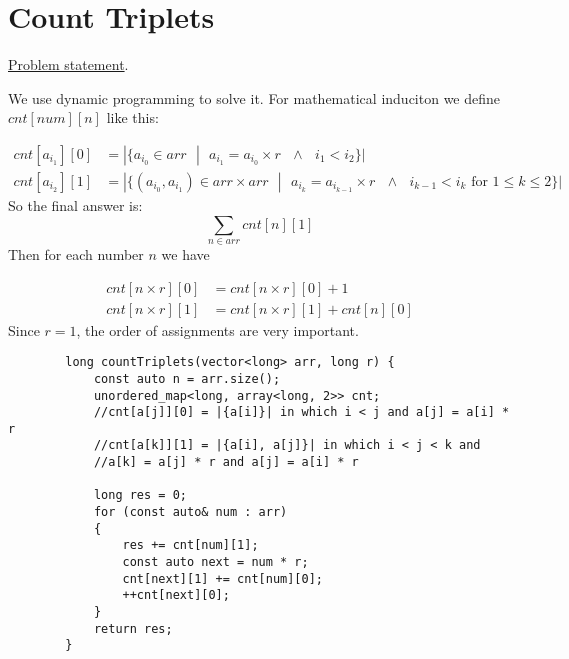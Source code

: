 \documentclass{book}
\begin{document}
 	\section{Count Triplets}
 	\href{https://www.hackerrank.com/challenges/count-triplets-1/problem?h_l=interview&playlist_slugs%5B%5D=interview-preparation-kit&playlist_slugs%5B%5D=dictionaries-hashmaps}{Problem statement}.
 		
 	\par We use dynamic programming to solve it. For mathematical induciton we define $cnt[num][n]$ like this:
 	
 	\begin{equation*}
 		\begin{split}
 		cnt[a_{i_1}][0] &= |\{a_{i_0} \in arr \text{ }| \text{ } a_{i_1} = a_{i_0} \times r \text{ }\land \text{ } i_1 < i_2\}| \\
 		cnt[a_{i_2}][1] &= |\{(a_{i_0}, a_{i_1}) \in arr \times arr \text{ }| \text{ } a_{i_k} = a_{i_{k - 1}} \times r \text{ }\land \text{ } i_{k - 1} < i_k  \text{ for }1 \le k \le 2\}|
 		\end{split}
 	\end{equation*}
 	So the final answer is:
 	\begin{equation*}
 	\sum_{n \in arr}{cnt[n][1]}
 	\end{equation*}
 	Then for each number $n$ we have
 	
 	\begin{equation*}
 	\begin{split}
 	cnt[n \times r][0] &= cnt[n \times r][0] + 1 \\
 	cnt[n \times r][1] &= cnt[n \times r][1] + cnt[n][0]
 	\end{split}
 	\end{equation*}
 	Since $r = 1$, the order of assignments are very important.
 	
 	\begin{lstlisting}
        long countTriplets(vector<long> arr, long r) {
            const auto n = arr.size();
            unordered_map<long, array<long, 2>> cnt;
            //cnt[a[j]][0] = |{a[i]}| in which i < j and a[j] = a[i] * r
            //cnt[a[k]][1] = |{a[i], a[j]}| in which i < j < k and 
            //a[k] = a[j] * r and a[j] = a[i] * r
            
            long res = 0;
            for (const auto& num : arr)
            {
                res += cnt[num][1];
                const auto next = num * r;
                cnt[next][1] += cnt[num][0];
                ++cnt[next][0];                       
            }
            return res;
        }
 	
 	\end{lstlisting}
\end{document}
